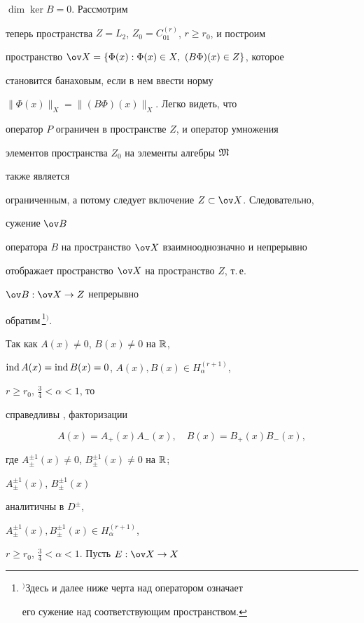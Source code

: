 \begin{pf}
$\dim\ker B=0$. Рассмотрим 


теперь пространства $Z=L_2$, $Z_0=C^{(r)}_{01}$, $r\ge r_0$, и построим 


пространство $\ov X=\{\Phi(x):\Phi(x)\in X,\ (B\Phi)(x)\in Z\}$, которое 


становится банаховым, если в нем ввести норму 


$\|\Phi(x)\|_X=\|(B\Phi)(x)\|_X$. Легко видеть, что 


оператор $P$ ограничен \cite{5} в пространстве $Z$, и оператор умножения 


элементов пространства $Z_0$ на элементы алгебры $\frak M$ 


также является 


ограниченным, а потому следует включение $Z\subset\ov X$. Следовательно, 


сужение $\ov B$ 


оператора $B$ на пространство $\ov X$ взаимнооднозначно и непрерывно 


отображает пространство $\ov X$ на пространство $Z$, т.\,е. 


$\ov B:\ov X\to Z$ непрерывно 


обратим\,\footnote{$^)$Здесь и далее ниже черта над оператором означает 


его сужение над соответствующим пространством.}{$^)$}. 


 


Так как $A(x)\ne 0$, $B(x)\ne 0$ на $\Bbb R$, 


$\operatorname{ind} A(x)=\operatorname{ind} B(x)=0$, $A(x),B(x)\in H^{(r+1)}_\alpha$, 


$r\ge r_0$, $\frac{3}{4}<\alpha< 1$, то 


справедливы \cite{6}, \cite{8} факторизации 


\begin{equation} 


A(x)=A_+(x)A_-(x),\quad B(x)=B_+(x)B_-(x), 


\end{equation} 


где $A^{\pm 1}_\pm(x)\ne 0$, $B^{\pm 1}_\pm(x)\ne 0$ на $\Bbb R$; 


$A^{\pm 1}_\pm(x)$, $B^{\pm 1}_\pm (x)$ 


аналитичны в $D^\pm$, 


$A^{\pm 1}_\pm(x),B^{\pm 1}_\pm(x)\in H^{(r+1)}_\alpha$, 


$r\ge r_0$, $\frac{3}{4}<\alpha< 1$. Пусть $E:\ov X\to X$ 



\end{pf}
